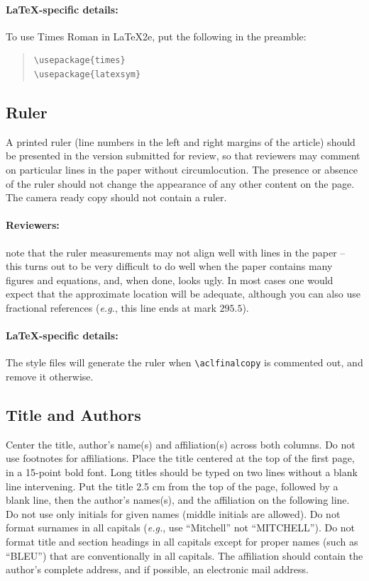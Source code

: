 \documentclass[11pt,a4paper]{article}
\begin{document}
\paragraph{\LaTeX-specific details:}
To use Times Roman in \LaTeX2e{}, put the following in the preamble:
\begin{quote}
\small
\begin{verbatim}
\usepackage{times}
\usepackage{latexsym}
\end{verbatim}
\end{quote}


\subsection{Ruler}
A printed ruler (line numbers in the left and right margins of the article) should be presented in the version submitted for review, so that reviewers may comment on particular lines in the paper without circumlocution.
The presence or absence of the ruler should not change the appearance of any other content on the page.
The camera ready copy should not contain a ruler.

\paragraph{Reviewers:}
note that the ruler measurements may not align well with lines in the paper -- this turns out to be very difficult to do well when the paper contains many figures and equations, and, when done, looks ugly.
In most cases one would expect that the approximate location will be adequate, although you can also use fractional references (\emph{e.g.}, this line ends at mark $295.5$).

\paragraph{\LaTeX-specific details:}
The style files will generate the ruler when {\small\verb|\aclfinalcopy|} is commented out, and remove it otherwise.

\subsection{Title and Authors}
\label{ssec:title-authors}

Center the title, author's name(s) and affiliation(s) across both columns.
Do not use footnotes for affiliations.
Place the title centered at the top of the first page, in a 15-point bold font.
Long titles should be typed on two lines without a blank line intervening.
Put the title 2.5 cm from the top of the page, followed by a blank line, then the author's names(s), and the affiliation on the following line.
Do not use only initials for given names (middle initials are allowed).
Do not format surnames in all capitals (\emph{e.g.}, use ``Mitchell'' not ``MITCHELL'').
Do not format title and section headings in all capitals except for proper names (such as ``BLEU'') that are
conventionally in all capitals.
The affiliation should contain the author's complete address, and if possible, an electronic mail address.
\end{document}
